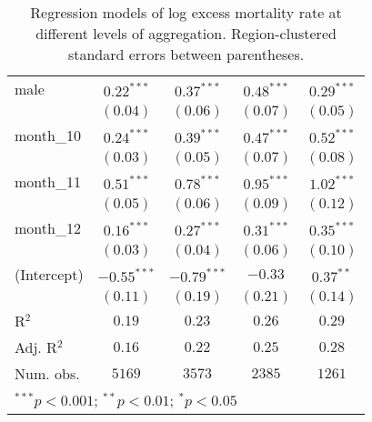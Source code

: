 \begin{table}
\begin{center}
\begin{tabular}{l c c c c}
male           & $0.22^{***}$  & $0.37^{***}$  & $0.48^{***}$  & $0.29^{***}$  \\
               & $(0.04)$      & $(0.06)$      & $(0.07)$      & $(0.05)$      \\
month\_10      & $0.24^{***}$  & $0.39^{***}$  & $0.47^{***}$  & $0.52^{***}$  \\
               & $(0.03)$      & $(0.05)$      & $(0.07)$      & $(0.08)$      \\
month\_11      & $0.51^{***}$  & $0.78^{***}$  & $0.95^{***}$  & $1.02^{***}$  \\
               & $(0.05)$      & $(0.06)$      & $(0.09)$      & $(0.12)$      \\
month\_12      & $0.16^{***}$  & $0.27^{***}$  & $0.31^{***}$  & $0.35^{***}$  \\
               & $(0.03)$      & $(0.04)$      & $(0.06)$      & $(0.10)$      \\
(Intercept)    & $-0.55^{***}$ & $-0.79^{***}$ & $-0.33$       & $0.37^{**}$   \\
               & $(0.11)$      & $(0.19)$      & $(0.21)$      & $(0.14)$      \\
\hline
R$^2$          & $0.19$        & $0.23$        & $0.26$        & $0.29$        \\
Adj. R$^2$     & $0.16$        & $0.22$        & $0.25$        & $0.28$        \\
Num. obs.      & $5169$        & $3573$        & $2385$        & $1261$        \\
\hline
\multicolumn{5}{l}{\scriptsize{$^{***}p<0.001$; $^{**}p<0.01$; $^{*}p<0.05$}}
\end{tabular}
\caption{Regression models of log excess mortality rate at different levels of aggregation. Region-clustered standard errors between parentheses.}
\label{tab:regionmodels}
\end{center}
\end{table}
